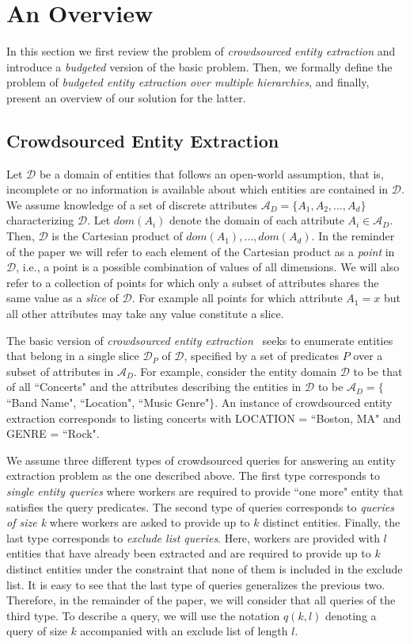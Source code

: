 \documentclass{vldb}
\newcommand{\domain}{\mathcal{D}}
\newcommand{\attributes}{\mathcal{A}_D}
\begin{document}
\section{An Overview}
In this section we first review the problem of {\em crowdsourced entity extraction} and introduce a {\em budgeted} version of the basic problem. Then, we formally define the problem of {\em budgeted entity extraction over multiple hierarchies}, and finally, present an overview of our solution for the latter.

\subsection{Crowdsourced Entity Extraction}
Let $\domain$ be a domain of entities that follows an open-world assumption, that is, incomplete or no information is available about which entities are contained in $\domain$. We assume knowledge of a set of discrete attributes $\attributes = \{A_1, A_2, \dots, A_d\}$ characterizing $\domain$. Let $dom(A_i)$ denote the domain of each attribute $A_i  \in \attributes$. Then, $\domain$ is the Cartesian product of $dom(A_1), \dots, dom(A_d)$. In the reminder of the paper we will refer to each element of the Cartesian product as a {\em point} in $\domain$, i.e., a point is a possible combination of values of all dimensions. We will also refer to a collection of points for which only a subset of attributes shares the same value as a {\em slice} of $\domain$. For example all points for which attribute $A_1 = x$ but all other attributes may take any value constitute a slice. 

The basic version of {\em crowdsourced entity extraction}~\cite{trushkowsky:2013} seeks to enumerate entities that belong in a single slice $\domain_P$ of $\domain$, specified by a set of predicates $P$ over a subset of attributes in $\attributes$. For example, consider the entity domain $\domain$ to be that of all ``Concerts" and the attributes describing the entities in $\domain$ to be $\attributes = \{$``Band Name", ``Location", ``Music Genre"$\}$. An instance of crowdsourced entity extraction corresponds to listing concerts with LOCATION = ``Boston, MA" and GENRE = ``Rock". 

We assume three different types of crowdsourced queries for answering an entity extraction problem as the one described above. The first type corresponds to {\em single entity queries} where workers are required to provide ``one more" entity that satisfies the query predicates. The second type of queries corresponds to {\em queries of  size k} where workers are asked to provide up to $k$ distinct entities. Finally, the last type corresponds to {\em exclude list queries}. Here,  workers are provided with $l$ entities that have already been extracted and are required to provide up to $k$ distinct entities under the constraint that none of them is included in the exclude list. It is easy to see that the last type of queries generalizes the previous two. Therefore, in the remainder of the paper, we will consider that all queries of the third type. To describe a query, we will use the notation $q(k,l)$ denoting a query of size $k$ accompanied with an exclude list of length $l$. 
\end{document}
